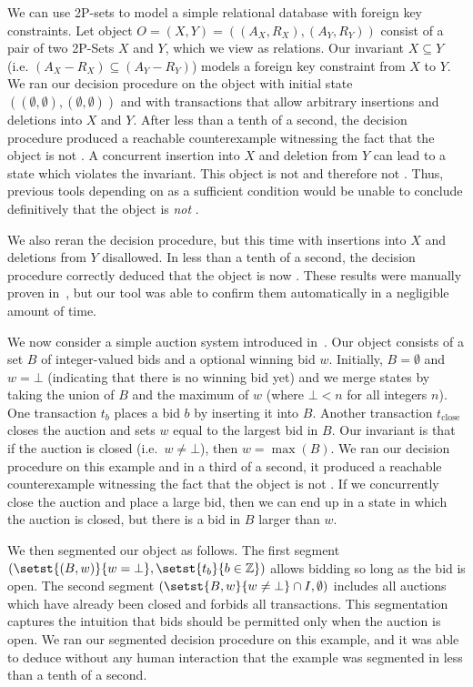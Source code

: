 We can use 2P-sets to model a simple relational database with foreign key
constraints. Let object $O = (X, Y) = ((A_X, R_X), (A_Y, R_Y))$ consist of a
pair of two 2P-Sets $X$ and $Y$, which we view as relations. Our invariant $X
\subseteq Y$ (i.e. $(A_X - R_X) \subseteq (A_Y - R_Y)$) models a foreign key
constraint from $X$ to $Y$. We ran our decision procedure on the object with
initial state $((\emptyset, \emptyset), (\emptyset, \emptyset))$ and
with transactions that allow arbitrary insertions and deletions into $X$ and
$Y$. After less than a tenth of a second, the decision procedure produced a
reachable counterexample witnessing the fact that the object is not
\invariantconfluent{}. A concurrent insertion into $X$ and deletion from $Y$ can
lead to a state which violates the invariant. This object is not
\invariantconfluent{} and therefore not \invariantclosed{}. Thus, previous tools
depending on \invariantclosure{} as a sufficient condition would be unable to
conclude definitively that the object is \emph{not} \invariantconfluent{}.

We also reran the decision procedure, but this time with insertions into $X$
and deletions from $Y$ disallowed. In less than a tenth of a second, the
decision procedure correctly deduced that the object is now
\invariantconfluent{}. These results were manually proven
in~\cite{bailis2014coordination}, but our tool was able to confirm them
automatically in a negligible amount of time.

\example[Auction]
We now consider a simple auction system introduced in~\cite{gotsman2016cause}.
Our object consists of a set $B$ of integer-valued bids and a optional winning
bid $w$. Initially, $B = \emptyset$ and $w = \bot$ (indicating that there is no
winning bid yet) and we merge states by taking the union of $B$ and the maximum
of $w$ (where $\bot < n$ for all integers $n$). One transaction $t_b$ places a bid
$b$ by inserting it into $B$. Another transaction $t_\text{close}$ closes the
auction and sets $w$ equal to the largest bid in $B$. Our invariant is that if
the auction is closed (i.e.\ $w \neq \bot$), then $w = \max(B)$. We ran our
decision procedure on this example and in a third of a second, it produced a
reachable counterexample witnessing the fact that the object is not
\invariantconfluent{}.  If we concurrently close the auction and place a large
bid, then we can end up in a state in which the auction is closed, but there is
a bid in $B$ larger than $w$.

We then segmented our object as follows. The first segment $(\setst{(B, w)}{w =
\bot}, \setst{t_b}{b \in \ints})$ allows bidding so long as the bid is open.
The second segment $(\setst{B, w}{w \neq \bot} \cap I, \emptyset)$ includes all
auctions which have already been closed and forbids all transactions. This
segmentation captures the intuition that bids should be permitted only when the
auction is open. We ran our segmented \invariantconfluence{} decision procedure
on this example, and it was able to deduce without any human interaction that
the example was segmented \invariantconfluent{} in less than a tenth of a second.

